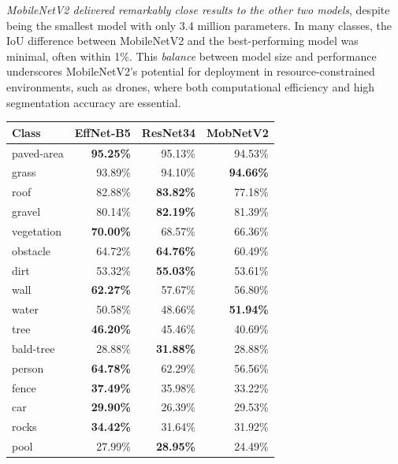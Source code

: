 \documentclass[a4paper]{article}
\begin{document}
\textit{MobileNetV2 delivered remarkably close results to the other two models}, despite being the smallest model with only 3.4 million parameters. In many classes, the IoU difference between MobileNetV2 and the best-performing model was minimal, often within 1\%. This \textit{balance} between model size and performance underscores MobileNetV2’s potential for deployment in resource-constrained environments, such as drones, where both computational efficiency and high segmentation accuracy are essential.

\begin{table}[htbp]
    \centering
    \small
    \setlength{\tabcolsep}{5pt} %
    \begin{tabular}{|l|r|r|r|}
    \hline
    \textbf{Class} & \textbf{EffNet-B5} & \textbf{ResNet34} & \textbf{MobNetV2} \\ \hline
    paved-area     & \textbf{95.25\%} & 95.13\% & 94.53\% \\ \hline
    grass          & 93.89\% & 94.10\% & \textbf{94.66\%} \\ \hline
    roof           & 82.88\% & \textbf{83.82\%} & 77.18\% \\ \hline
    gravel         & 80.14\% & \textbf{82.19\%} & 81.39\% \\ \hline
    vegetation     & \textbf{70.00\%} & 68.57\% & 66.36\% \\ \hline
    obstacle       & 64.72\% & \textbf{64.76\%} & 60.49\% \\ \hline
    dirt           & 53.32\% & \textbf{55.03\%} & 53.61\% \\ \hline
    wall           & \textbf{62.27\%} & 57.67\% & 56.80\% \\ \hline
    water          & 50.58\% & 48.66\% & \textbf{51.94\%} \\ \hline
    tree           & \textbf{46.20\%} & 45.46\% & 40.69\% \\ \hline
    bald-tree      & 28.88\% & \textbf{31.88\%} & 28.88\% \\ \hline
    person         & \textbf{64.78\%} & 62.29\% & 56.56\% \\ \hline
    fence          & \textbf{37.49\%} & 35.98\% & 33.22\% \\ \hline
    car            & \textbf{29.90\%} & 26.39\% & 29.53\% \\ \hline
    rocks          & \textbf{34.42\%} & 31.64\% & 31.92\% \\ \hline
    pool           & 27.99\% & \textbf{28.95\%} & 24.49\% \\ \hline

\end{tabular}
\end{table}
\end{document}
